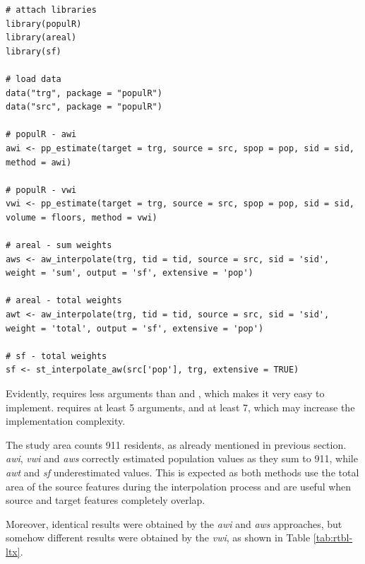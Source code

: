 \begin{verbatim}
# attach libraries
library(populR)
library(areal)
library(sf)

# load data
data("trg", package = "populR")
data("src", package = "populR")

# populR - awi
awi <- pp_estimate(target = trg, source = src, spop = pop, sid = sid,
method = awi)

# populR - vwi
vwi <- pp_estimate(target = trg, source = src, spop = pop, sid = sid,
volume = floors, method = vwi)

# areal - sum weights
aws <- aw_interpolate(trg, tid = tid, source = src, sid = 'sid',
weight = 'sum', output = 'sf', extensive = 'pop')

# areal - total weights
awt <- aw_interpolate(trg, tid = tid, source = src, sid = 'sid',
weight = 'total', output = 'sf', extensive = 'pop')

# sf - total weights
sf <- st_interpolate_aw(src['pop'], trg, extensive = TRUE)
\end{verbatim}

Evidently,  requires less arguments than  and , which makes it very easy to implement.  requires at least 5 arguments, and  at least 7, which may increase the implementation complexity.

The study area counts 911 residents, as already mentioned in previous section. \emph{awi}, \emph{vwi} and \emph{aws}
correctly estimated population values as they sum to 911, while \emph{awt} and \emph{sf} underestimated values.
This is expected as both methods use the total area of the source features during the interpolation
process and are useful when source and target features completely overlap.

Moreover, identical results were obtained by the \emph{awi} and \emph{aws} approaches, but somehow different
results were obtained by the \emph{vwi}, as shown in Table \ref{tab:rtbl-ltx}.

